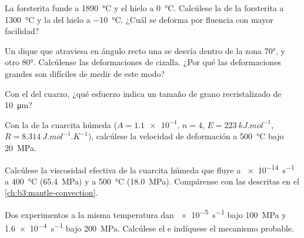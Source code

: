 \begin{exercise}[$\star$]\label{exo:b3:deformation-mechanisms:1}
La forsterita funde a \qty{1890}{\celsius} y el hielo a \qty{0}{\celsius}. Calcúlese
la  de la forsterita a \qty{1300}{\celsius} y la del hielo a
\qty{-10}{\celsius}. ¿Cuál se deforma por fluencia con mayor facilidad?
\end{exercise}

\begin{exercise}[$\star$]\label{exo:b3:deformation-mechanisms:2}
Un dique que atraviesa en ángulo recto una  se desvía dentro de la
zona \ang{70}, y otro \ang{80}. Calcúlense las deformaciones de cizalla. ¿Por qué las
deformaciones grandes son difíciles de medir de este modo?
\end{exercise}

\begin{exercise}[$\star$]\label{exo:b3:deformation-mechanisms:3}
Con el  del cuarzo, ¿qué esfuerzo indica un tamaño de grano recristalizado de
\qty{10}{\micro m}?
\end{exercise}

\begin{exercise}[$\star$]\label{exo:b3:deformation-mechanisms:4}
Con la  de la cuarcita húmeda ($A = \num{1.1e-4}$, $n = 4$, $E =
\qty{223}{kJ.mol^{-1}}$, $R = \qty{8.314}{J.mol^{-1}.K^{-1}}$), calcúlese la
velocidad de deformación a \qty{500}{\celsius} bajo \qty{20}{MPa}.
\end{exercise}

\begin{exercise}[$\star\star$]\label{exo:b3:deformation-mechanisms:5}
Calcúlese la viscosidad efectiva de la cuarcita húmeda que fluye a \qty{e-14}{s^{-1}}
a \qty{400}{\celsius} (\qty{65.4}{MPa}) y a \qty{500}{\celsius}
(\qty{18.0}{MPa}). Compárense con las 
descritas en el \cref{ch:b3:mantle-convection}.
\end{exercise}

\begin{exercise}[$\star\star$]\label{exo:b3:deformation-mechanisms:6}
Dos experimentos a la misma temperatura dan \qty{e-5}{s^{-1}} bajo
\qty{100}{MPa} y \qty{1.6e-4}{s^{-1}} bajo \qty{200}{MPa}. Calcúlese el  e indíquese el mecanismo probable.
\end{exercise}

